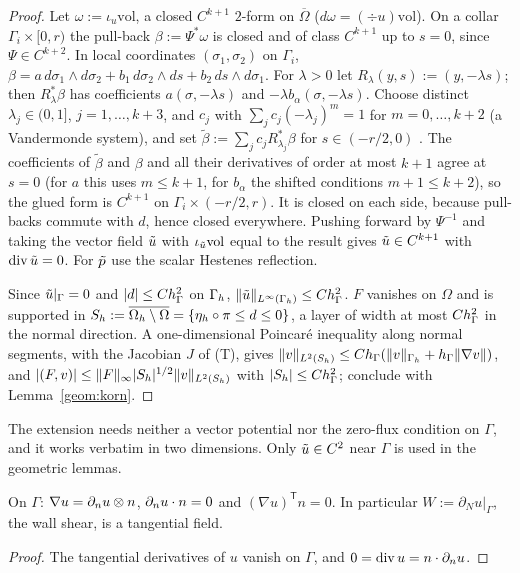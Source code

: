 \begin{proof}
Let $\omega:=\iota_u\mathrm{vol}$, a closed $C^{k+1}$ $2$-form on $\overline\Omega$ ($d\omega=(\div u)\mathrm{vol}$). On a collar $\Gamma_i\times[0,r)$ the pull-back $\beta:=\Psi^\ast\omega$ is closed and of class $C^{k+1}$ up to $s=0$, since $\Psi\in C^{k+2}$. In local coordinates $(\sigma_1,\sigma_2)$ on $\Gamma_i$, $\beta=a\,d\sigma_1\wedge d\sigma_2+b_1\,d\sigma_2\wedge ds+b_2\,ds\wedge d\sigma_1$. For $\lambda>0$ let $R_\lambda(y,s):=(y,-\lambda s)$; then $R_\lambda^\ast\beta$ has coefficients $a(\sigma,-\lambda s)$ and $-\lambda b_\alpha(\sigma,-\lambda s)$. Choose distinct $\lambda_j\in(0,1]$, $j=1,\dots,k+3$, and $c_j$ with $\sum_jc_j(-\lambda_j)^m=1$ for $m=0,\dots,k+2$ (a Vandermonde system), and set $\tilde\beta:=\sum_jc_jR_{\lambda_j}^\ast\beta$ for $s\in(-r/2,0)$ \cite{Hestenes1941}. The coefficients of $\tilde\beta$ and $\beta$ and all their derivatives of order at most $k+1$ agree at $s=0$ (for $a$ this uses $m\le k+1$, for $b_\alpha$ the shifted conditions $m+1\le k+2$), so the glued form is $C^{k+1}$ on $\Gamma_i\times(-r/2,r)$. It is closed on each side, because pull-backs commute with $d$, hence closed everywhere. Pushing forward by $\Psi^{-1}$ and taking the vector field $\tilde u$ with $\iota_{\tilde u}\mathrm{vol}$ equal to the result gives $\tilde u\in C^{k+1}$ with $\operatorname{div}\tilde u=0$. For $\tilde p$ use the scalar Hestenes reflection.

Since $\tilde u|_\Gamma=0$ and $|d|\le Ch_\Gamma^2$ on $\Gamma_h$, $\lVert \tilde u\rVert_{L^\infty(\Gamma_h)}\le Ch_\Gamma^2$. $F$ vanishes on $\Omega$ and is supported in $S_h:=\overline{\Omega_h\setminus\Omega}=\{\eta_h\circ\pi\le d\le0\}$, a layer of width at most $Ch_\Gamma^2$ in the normal direction. A one-dimensional Poincar\'e inequality along normal segments, with the Jacobian $J$ of (T), gives $\lVert v\rVert_{L^2(S_h)}\le Ch_\Gamma(\lVert v\rVert_{\Gamma_h}+h_\Gamma\lVert \nabla v\rVert)$, and $|(F,v)|\le\lVert F\rVert_\infty|S_h|^{1/2}\lVert v\rVert_{L^2(S_h)}$ with $|S_h|\le Ch_\Gamma^2$; conclude with Lemma~\ref{geom:korn}.
\end{proof}
The extension needs neither a vector potential nor the zero-flux condition on $\Gamma$, and it works verbatim in two dimensions. Only $\tilde u\in C^2$ near $\Gamma$ is used in the geometric lemmas.

\begin{lemma}\label{geom:wall}
On $\Gamma$: $\nabla u=\partial_n u\otimes n$, $\partial_n u\cdot n=0$ and $(\nabla u)^{\mathsf T}n=0$. In particular $W:=\partial_Nu|_\Gamma$, the wall shear, is a tangential field.
\end{lemma}

\begin{proof}
The tangential derivatives of $u$ vanish on $\Gamma$, and $0=\operatorname{div} u=n\cdot\partial_n u$.
\end{proof}
